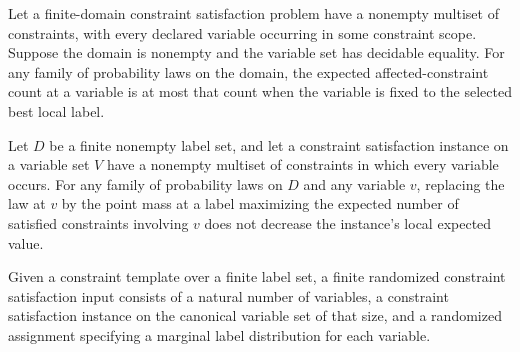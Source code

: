 \begin{theorem}
\label{FABL.CSPInstance.pmfExpectation_le_bestLocalLabel}
\leanok
{}
Let a finite-domain constraint satisfaction problem have a nonempty multiset of
constraints, with every declared variable occurring in some constraint scope. Suppose
the domain is nonempty and the variable set has decidable equality. For any family of
probability laws on the domain, the expected affected-constraint count at a variable is
at most that count when the variable is fixed to the selected best local label.
\end{theorem}

\begin{theorem}
\label{FABL.CSPInstance.localExpectedValue_le_replace_bestLocalLabel}
\leanok
{}
Let $D$ be a finite nonempty label set, and let a constraint satisfaction instance on a
variable set $V$ have a nonempty multiset of constraints in which every variable occurs.
For any family of probability laws on $D$ and any variable $v$, replacing the law at $v$
by the point mass at a label maximizing the expected number of satisfied constraints
involving $v$ does not decrease the instance's local expected value.
\end{theorem}

\begin{definition}
\label{FABL.FiniteRandomizedCSPInput}
\leanok
{}
Given a constraint template over a finite label set, a finite randomized constraint
satisfaction input consists of a natural number of variables, a constraint satisfaction
instance on the canonical variable set of that size, and a randomized assignment
specifying a marginal label distribution for each variable.
\end{definition}


